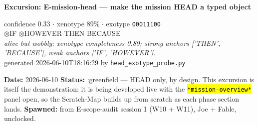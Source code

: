 \documentclass[11pt,oneside]{article}
\newcommand{\scopehl}[1]{\texttt{\hl{#1}}}
\begin{document}
\begin{center}{\LARGE\bfseries Excursion: E-mission-head --- make the mission HEAD a typed object}\end{center}
\begin{vitalsbox}
confidence 0.33 $\cdot$ xenotype 89\% $\cdot$ exotype \texttt{00011100}\\[2pt]$\otimes$\textsf{\small IF} $\otimes$\textsf{\small HOWEVER} \checkmark{}\textsf{\small THEN} \checkmark{}\textsf{\small BECAUSE}\\[3pt]\emph{alive but wobbly: xenotype completeness 0.89; strong anchors ['THEN', 'BECAUSE'], weak anchors ['IF', 'HOWEVER'].}\\[2pt]{\scriptsize generated 2026-06-10T18:16:29 by \texttt{head\_exotype\_probe.py}}
\end{vitalsbox}


\textbf{Date:} 2026-06-10
\textbf{Status:} :greenfield --- HEAD only, by design. This excursion is itself the
demonstration: it is being developed live with the \scopehl{*mission-overview*} panel
open, so the Scratch-Map builds up from scratch as each phase section lands.
\textbf{Spawned:} from E-scope-audit session 1 (W10 + W11), Joe + Fable, unclocked.
\end{document}
